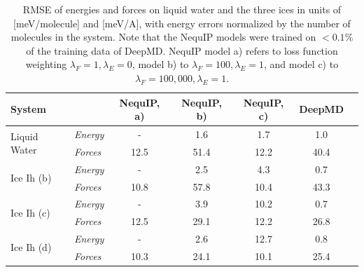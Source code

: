 \documentclass[%
reprint,
superscriptaddress,
nofootinbib,
amsmath,amssymb,
aps,
prl,
]{revtex4-1}
\begin{document}
\begin{table}[!htbp]
\centering
\begin{tabular}{llccccc}
\hline \hline
System & &   NequIP, a) & NequIP, b) & NequIP, c)  & DeepMD  \\
\hline
\multirow{2}{*}{Liquid Water}  
                          & \textit{Energy} & -  & 1.6  & 1.7 & 1.0 \\
                          & \textit{Forces} &  12.5 & 51.4 & 12.2 & 40.4 \\ \hline
                          
\multirow{2}{*}{Ice Ih (b)}   
                          & \textit{Energy} & -  & 2.5 & 4.3 & 0.7 \\
                          & \textit{Forces} &  10.8  & 57.8  & 10.4 & 43.3 \\ \hline
                          
\multirow{2}{*}{Ice Ih (c)}  
                         & \textit{Energy} & -  &  3.9 & 10.2 & 0.7 \\
                          & \textit{Forces} &  12.5 & 29.1 & 12.2 & 26.8 \\ \hline
                          
\multirow{2}{*}{Ice Ih (d)} 
                          & \textit{Energy} &  - &  2.6  & 12.7 & 0.8 \\
                          & \textit{Forces} &  10.3 &  24.1 & 10.1 & 25.4\\ \hline

  \hline \hline
    \end{tabular}
    \caption{RMSE of energies and forces on liquid water and the three ices in units of [meV/molecule] and [meV/A], with energy errors normalized by the number of molecules in the system. Note that the NequIP models were trained on $<0.1\%$ of the training data of DeepMD. NequIP model a) refers to loss function weighting $\lambda_F=1, \lambda_E=0$, model b) to $\lambda_F=100, \lambda_E=1$, and model c) to $\lambda_F=100,000, \lambda_E=1$.}
    \label{tab:deepmd}
\end{table}
\end{document}
